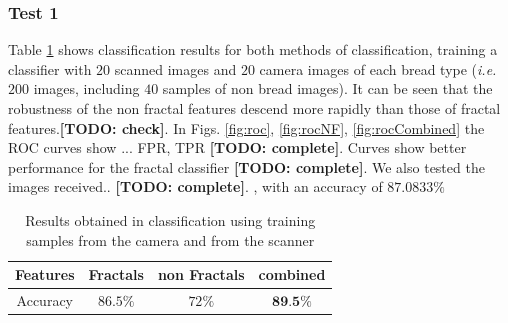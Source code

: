 \documentclass[oneside,a4paper,english,links]{amca}
\newcommand{\todo}[1]{\textbf{[TODO: #1]}}
\begin{document}
\subsubsection{Test 1}
Table \ref{table:tableRobustnessTest1} shows classification results for both methods of classification, training a classifier with $20$ scanned images and $20$ camera images of each bread type ({\em i.e.} $200$ images, including $40$ samples of non bread images). It can be seen that the robustness of the non fractal features descend more rapidly than those of fractal features.\todo{check}. In Figs. \ref{fig:roc}, \ref{fig:rocNF}, \ref{fig:rocCombined} the ROC curves show ... FPR, TPR \todo{complete}. Curves show better performance for the fractal classifier \todo{complete}. We also tested the images received.. \todo{complete}. , with an accuracy of $87.0833\%$

\begin{table}[htb]
\centering
\begin{tabular}{|c|c|c|c|}
    \hline
    Features & Fractals & non Fractals & combined\\
    \hline
    \hline
    Accuracy  & $86.5\%$ & $72\%$ & $\textbf{89.5\%}$\\
    \hline
\end{tabular}
\caption{Results obtained in classification using training samples from the camera and from the scanner}
\label{table:tableRobustnessTest1}
\end{table}
\end{document}
